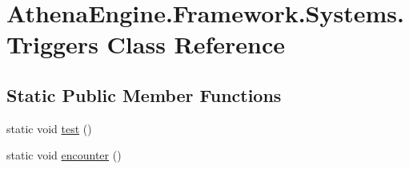 \hypertarget{class_athena_engine_1_1_framework_1_1_systems_1_1_triggers}{\section{Athena\-Engine.\-Framework.\-Systems.\-Triggers Class Reference}
\label{class_athena_engine_1_1_framework_1_1_systems_1_1_triggers}
}
\subsection*{Static Public Member Functions}
\begin{DoxyCompactItemize}
\item 
static void \hyperlink{class_athena_engine_1_1_framework_1_1_systems_1_1_triggers_a57b6ae93f936b5405f9e33f223de3633}{test} ()
\item 
static void \hyperlink{class_athena_engine_1_1_framework_1_1_systems_1_1_triggers_af7fc8dab644845a5cfedde63f4055ac0}{encounter} ()
\end{DoxyCompactItemize}


